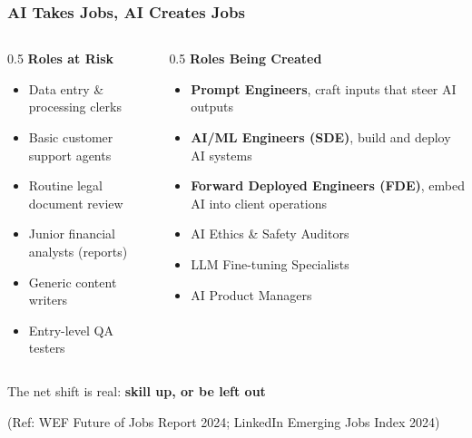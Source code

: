 \begin{frame}[fragile]\frametitle{AI Takes Jobs, AI Creates Jobs}
\begin{columns}
  \begin{column}[T]{0.5\linewidth}
    \textbf{Roles at Risk}
    \begin{itemize}
      \item Data entry \& processing clerks
      \item Basic customer support agents
      \item Routine legal document review
      \item Junior financial analysts (reports)
      \item Generic content writers
      \item Entry-level QA testers
    \end{itemize}
  \end{column}
  \begin{column}[T]{0.5\linewidth}
    \textbf{Roles Being Created}
    \begin{itemize}
      \item \textbf{Prompt Engineers}, craft inputs that steer AI outputs
      \item \textbf{AI/ML Engineers (SDE)}, build and deploy AI systems
      \item \textbf{Forward Deployed Engineers (FDE)}, embed AI into client operations
      \item AI Ethics \& Safety Auditors
      \item LLM Fine-tuning Specialists
      \item AI Product Managers
    \end{itemize}
  \end{column}
\end{columns}
\vspace{0.3cm}
{\small The net shift is real: \textbf{skill up, or be left out}}
 
{\tiny (Ref: WEF Future of Jobs Report 2024; LinkedIn Emerging Jobs Index 2024)}
\end{frame}
 

